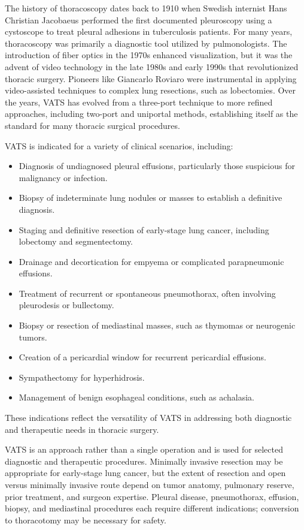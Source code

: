 The history of thoracoscopy dates back to 1910 when Swedish internist Hans Christian Jacobaeus performed the first documented pleuroscopy using a cystoscope to treat pleural adhesions in tuberculosis patients. For many years, thoracoscopy was primarily a diagnostic tool utilized by pulmonologists. The introduction of fiber optics in the 1970s enhanced visualization, but it was the advent of video technology in the late 1980s and early 1990s that revolutionized thoracic surgery. Pioneers like Giancarlo Roviaro were instrumental in applying video-assisted techniques to complex lung resections, such as lobectomies. Over the years, VATS has evolved from a three-port technique to more refined approaches, including two-port and uniportal methods, establishing itself as the standard for many thoracic surgical procedures.

VATS is indicated for a variety of clinical scenarios, including:

\begin{itemize}
  \item Diagnosis of undiagnosed pleural effusions, particularly those suspicious for malignancy or infection.
  \item Biopsy of indeterminate lung nodules or masses to establish a definitive diagnosis.
  \item Staging and definitive resection of early-stage lung cancer, including lobectomy and segmentectomy.
  \item Drainage and decortication for empyema or complicated parapneumonic effusions.
  \item Treatment of recurrent or spontaneous pneumothorax, often involving pleurodesis or bullectomy.
  \item Biopsy or resection of mediastinal masses, such as thymomas or neurogenic tumors.
  \item Creation of a pericardial window for recurrent pericardial effusions.
  \item Sympathectomy for hyperhidrosis.
  \item Management of benign esophageal conditions, such as achalasia.
\end{itemize}

These indications reflect the versatility of VATS in addressing both diagnostic and therapeutic needs in thoracic surgery.

VATS is an approach rather than a single operation and is used for selected diagnostic and therapeutic procedures. Minimally invasive resection may be appropriate for early-stage lung cancer, but the extent of resection and open versus minimally invasive route depend on tumor anatomy, pulmonary reserve, prior treatment, and surgeon expertise. Pleural disease, pneumothorax, effusion, biopsy, and mediastinal procedures each require different indications; conversion to thoracotomy may be necessary for safety.

